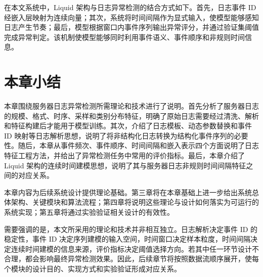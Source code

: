 在本文系统中，Liquid 架构与日志异常检测的结合方式如下。首先，日志事件 ID 经嵌入层映射为连续向量；其次，系统将时间间隔作为显式输入，使模型能够感知日志产生节奏；最后，模型根据窗口内事件序列输出异常评分，并通过验证集阈值完成异常判定。该机制使模型能够同时利用事件语义、事件顺序和非规则时间信息。

\section{本章小结}

本章围绕服务器日志异常检测所需理论和技术进行了说明。首先分析了服务器日志的规模、格式、时序、采样和类别分布特征，明确了原始日志需要经过清洗、解析和特征构建后才能用于模型训练。其次，介绍了日志模板、动态参数替换和事件 ID 映射等日志解析思想，说明了将非结构化日志转换为结构化事件序列的必要性。随后，本章从事件频次、事件顺序、时间间隔和嵌入表示四个方面说明了日志特征工程方法，并给出了异常检测任务中常用的评价指标。最后，本章介绍了 Liquid 架构的连续时间建模思想，说明了其与服务器日志非规则时间间隔特征之间的对应关系。

本章内容为后续系统设计提供理论基础。第三章将在本章基础上进一步给出系统总体架构、关键模块和算法流程；第四章将说明这些理论与设计如何落实为可运行的系统实现；第五章将通过实验验证相关设计的有效性。

需要强调的是，本文所采用的理论和技术并非相互独立。日志解析决定事件 ID 的稳定性，事件 ID 决定序列建模的输入空间，时间窗口决定样本粒度，时间间隔决定连续时间建模的信息来源，评价指标决定阈值选择方向。若其中任一环节设计不合理，都会影响最终异常检测效果。因此，后续章节将按照数据流顺序展开，使每个模块的设计目的、实现方式和实验验证形成对应关系。
